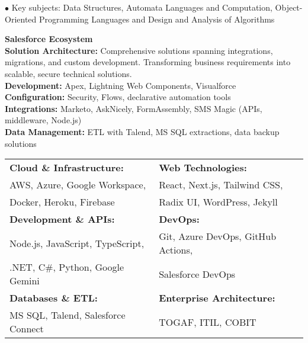 \documentclass[11pt,article,oneside]{memoir}
\begin{document}
\ind \hspace{0.35in} $\bullet$ Key subjects: Data Structures, Automata Languages and Computation, Object-Oriented Programming Languages and Design and Analysis of Algorithms

\bigskip
\newpage


\noindent\textbf{Salesforce Ecosystem}\\[0.5ex]
\noindent\hspace{0.5em}\textbf{Solution Architecture:} Comprehensive solutions spanning integrations, migrations, and custom development. Transforming business requirements into scalable, secure technical solutions.\\[0.5ex]
\noindent\textbf{Development:} Apex, Lightning Web Components, Visualforce\\[0.5ex]
\noindent\textbf{Configuration:} Security, Flows, declarative automation tools\\[0.5ex]
\noindent\textbf{Integrations:} Marketo, AskNicely, FormAssembly, SMS Magic (APIs, middleware, Node.js)\\[0.5ex]
\noindent\textbf{Data Management:} ETL with Talend, MS SQL extractions, data backup solutions

\bigskip

\vspace{0.5em}

\noindent
\begin{tabular}{@{}p{}p{}@{}}
\textbf{Cloud \& Infrastructure:} & \textbf{Web Technologies:} \\
AWS, Azure, Google Workspace, & React, Next.js, Tailwind CSS, \\
Docker, Heroku, Firebase & Radix UI, WordPress, Jekyll \\[0.8ex]

\textbf{Development \& APIs:} & \textbf{DevOps:} \\
Node.js, JavaScript, TypeScript, & Git, Azure DevOps, GitHub Actions, \\
.NET, C\#, Python, Google Gemini & Salesforce DevOps \\[0.8ex]

\textbf{Databases \& ETL:} & \textbf{Enterprise Architecture:} \\
MS SQL, Talend, Salesforce Connect & TOGAF, ITIL, COBIT \\
\end{tabular}
\end{document}
